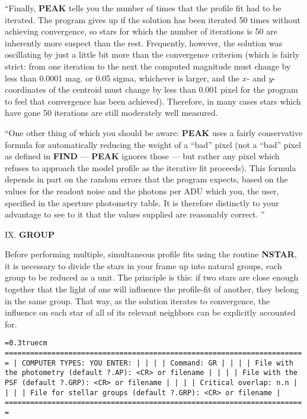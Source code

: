 ``Finally, {\bf PEAK} tells you the number of times that the profile
fit had to be iterated.  The program gives up if the solution has been
iterated 50 times without achieving convergence, so stars for which the
number of iterations is 50 are inherently more suspect than the rest.
Frequently, however, the solution was oscillating by just a little bit
more than the convergence criterion (which is fairly strict: from one
iteration to the next the computed magnitude must change by less than
0.0001 mag. or 0.05 sigma, whichever is larger, and the $x$- and
$y$-coordinates of the centroid must change by less than 0.001 pixel
for the program to feel that convergence has been achieved).
Therefore, in many cases stars which have gone 50 iterations are still
moderately well measured.

``One other thing of which you should be aware:  {\bf PEAK} uses a
fairly conservative formula for automatically reducing the weight of a
``bad'' pixel (not a ``bad'' pixel as defined in {\bf FIND} --- {\bf
PEAK} ignores those --- but rather any pixel which refuses to approach
the model profile as the iterative fit proceeds).  This formula depends
in part on the random errors that the program expects, based on the
values for the readout noise and the photons per ADU which you, the
user, specified in the aperture photometry table.  It is therefore
distinctly to your advantage to see to it that the values supplied are
reasonably correct. ''

\vfill
\eject
\noindent IX.  {\bf GROUP}

Before performing multiple, simultaneous profile fits using the routine
{\bf NSTAR}, it is necessary to divide the stars in your frame up into
natural groups, each group to be reduced as a unit.  The principle is
this:  if two stars are close enough together that the light of one
will influence the profile-fit of another, they belong in the same
group.  That way, as the solution iterates to convergence, the
influence on each star of all of its relevant neighbors can be
explicitly accounted for.

\bigskip
{\noindent\obeylines\obeyspaces\frenchspacing\tt\baselineskip=0.3truecm
=======================================================================
| COMPUTER TYPES:                                  YOU ENTER:         |
|                                                                     |
| Command:                                         GR                 |
|                                                                     |
|     File with the photometry (default ?.AP):     <CR> or filename   |
|                                                                     |
|           File with the PSF (default ?.GRP):     <CR> or filename   |
|                                                                     |
|                            Critical overlap:     n.n                |
|                                                                     |
|     File for stellar groups (default ?.GRP):     <CR> or filename   |
=======================================================================
}
\bigskip

